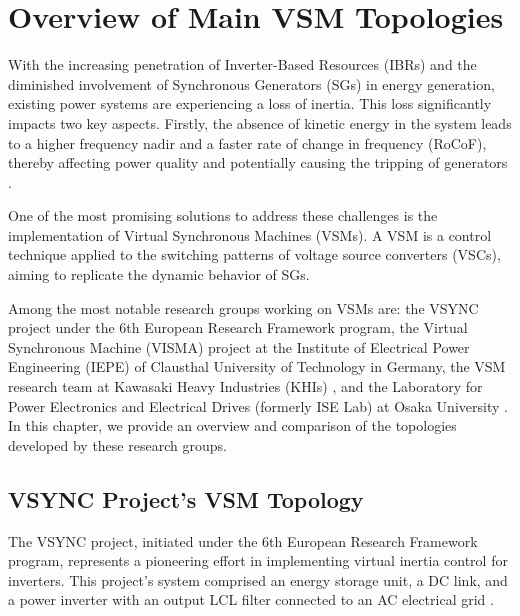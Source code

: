 \chapter{Overview of Main VSM Topologies}\label{chap:vsm-overview}

With the increasing penetration of Inverter-Based Resources (IBRs) and the
diminished involvement of Synchronous Generators (SGs) in energy generation,
existing power systems are experiencing a loss of inertia. This loss
significantly impacts two key aspects. Firstly, the absence of kinetic energy in
the system leads to a higher frequency nadir and a faster rate of change in
frequency (RoCoF), thereby affecting power quality and potentially causing the
tripping of generators \cite{alipoor2015power}.

One of the most promising solutions to address these challenges is the
implementation of Virtual Synchronous Machines (VSMs). A VSM is a control
technique applied to the switching patterns of voltage source converters (VSCs),
aiming to replicate the dynamic behavior of SGs.

Among the most notable research groups working on VSMs are: the VSYNC project
\cite{visscher2008vsg} under the 6th European Research Framework program, the
Virtual Synchronous Machine (VISMA) project \cite{beck2007vsm} at the Institute
of Electrical Power Engineering (IEPE) of Clausthal University of Technology in
Germany, the VSM research team at Kawasaki Heavy Industries (KHIs)
\cite{hirase2013grid}, and the Laboratory for Power Electronics and Electrical
Drives (formerly ISE Lab) at Osaka University \cite{alipoor2015power,
sakimoto2011stabilization, liu2017vsg}. In this chapter, we provide an overview
and comparison of the topologies developed by these research groups.

\section{VSYNC Project's VSM Topology}\label{sec:VSYNC}

The VSYNC project, initiated under the 6th European Research Framework program,
represents a pioneering effort in implementing virtual inertia control for
inverters. This project's system comprised an energy storage unit, a DC link,
and a power inverter with an output LCL filter connected to an AC electrical
grid \cite{visscher2008vsg}.

